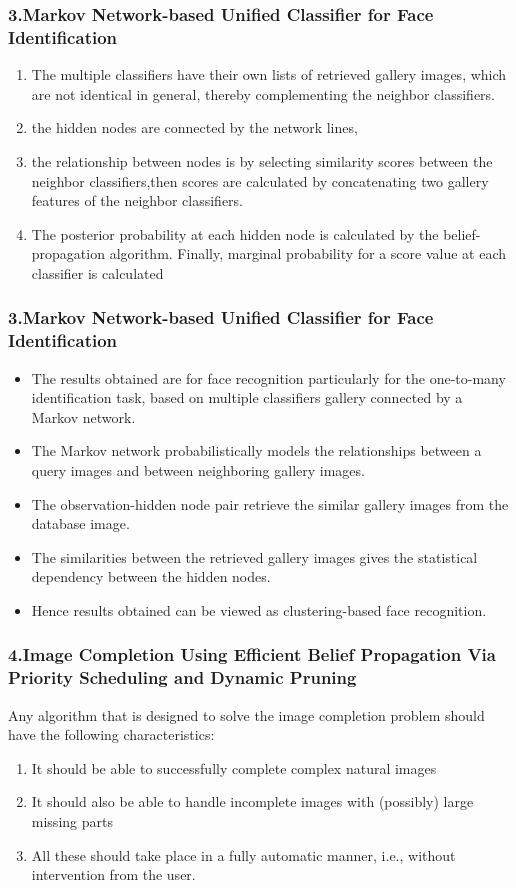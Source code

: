 \documentclass{beamer}
\begin{document}
\begin{frame}
\frametitle{\textbf{3.Markov Network-based Unified Classifier for Face Identification}}
\begin{enumerate}
\item The multiple classifiers have their own lists of retrieved gallery images, which are not identical in general, thereby complementing the neighbor classifiers.
\item  the hidden nodes are connected by the network lines,
  \item  the relationship between nodes is by selecting similarity scores between the neighbor classifiers,then scores are calculated by concatenating  two gallery features of the neighbor classifiers.


  \item The posterior probability at each hidden node is calculated by the belief-propagation algorithm. Finally, marginal probability for a score value at each classifier is calculated
\end{enumerate}
\end{frame}

\begin{frame}
\frametitle{\textbf{3.Markov Network-based Unified Classifier for Face Identification}}
\begin{itemize}
\item The results obtained are for face recognition particularly for the one-to-many identification task, based on multiple classifiers gallery connected by a Markov network.
\item The Markov network probabilistically models the relationships between a query  images and between neighboring gallery images.
\item The observation-hidden node pair retrieve the  similar gallery images from the database image.
\item The similarities between the retrieved gallery images gives the statistical dependency between the hidden nodes.
\item Hence results obtained can be viewed as clustering-based face recognition.
\end{itemize}
\end{frame}
\begin{frame}
\frametitle{\textbf{4.Image Completion Using Efficient Belief Propagation Via Priority Scheduling and Dynamic Pruning}}

Any algorithm that is designed to solve the image completion problem should have the following characteristics:
\begin{enumerate}
  \item It should be able to successfully complete complex natural images
  \item It should also be able to handle incomplete images with
(possibly) large missing parts
  \item All these should take place in a fully automatic manner, i.e.,
without intervention from the user.
\end{enumerate}
\end{frame}
\end{document}
